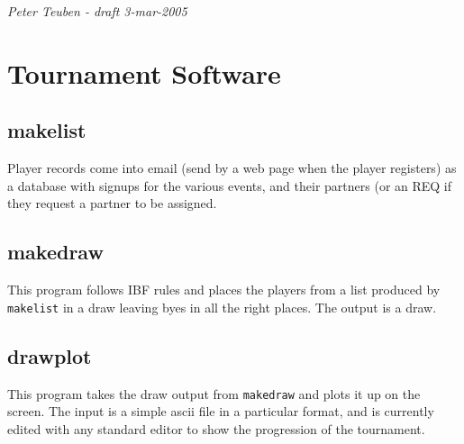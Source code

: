 

\setlength{\parindent}{0pt}
\setlength{\parskip}{2.5mm}






\begin{center}
{\it Peter Teuben - draft 3-mar-2005}
\end{center}

\section{Tournament Software}

\subsection*{makelist}

Player records come into email (send by a web page when the player
registers)
as a database with signups for the various
events, and their partners (or an REQ if they request a partner to be
assigned.

\subsection*{makedraw}

This program follows IBF rules and places the players from a list
produced by {\tt makelist} in a draw leaving
byes in all the right places. The output is a draw.

\subsection*{drawplot}

This program takes the draw output from {\tt makedraw} and plots it
up on the screen. The input is a simple ascii file in a particular format,
and is currently edited with any standard editor to show the progression
of the tournament.

